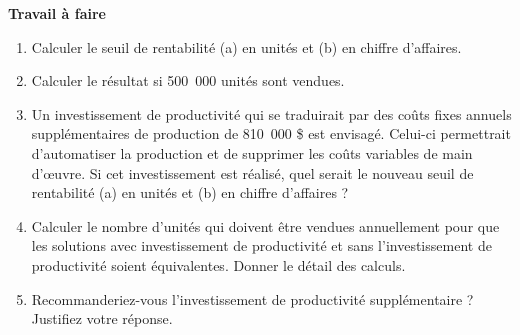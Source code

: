 \documentclass{tufte-handout}
\begin{document}
\begin{enumerate}
\textbf{Travail à faire}\\
\begin{enumerate}
\item Calculer le seuil de rentabilité (a) en unités et (b) en chiffre d’affaires.\\
\item Calculer le résultat si 500 000 unités sont vendues.\\
\item Un investissement de productivité qui se traduirait par des coûts fixes annuels supplémentaires de production de 810 000 \$ est envisagé. Celui-ci permettrait d’automatiser la production et de supprimer les coûts variables de main d’œuvre. Si cet investissement est réalisé, quel serait le nouveau seuil de rentabilité (a) en unités et (b) en chiffre d’affaires ?\\
\item Calculer le nombre d’unités qui doivent être vendues annuellement pour que les solutions avec investissement de productivité et sans l’investissement de productivité soient équivalentes. Donner le détail des calculs.\\
\item Recommanderiez-vous l’investissement de productivité supplémentaire ? Justifiez votre réponse.\\
\end{enumerate}


\end{enumerate}
\end{document}
